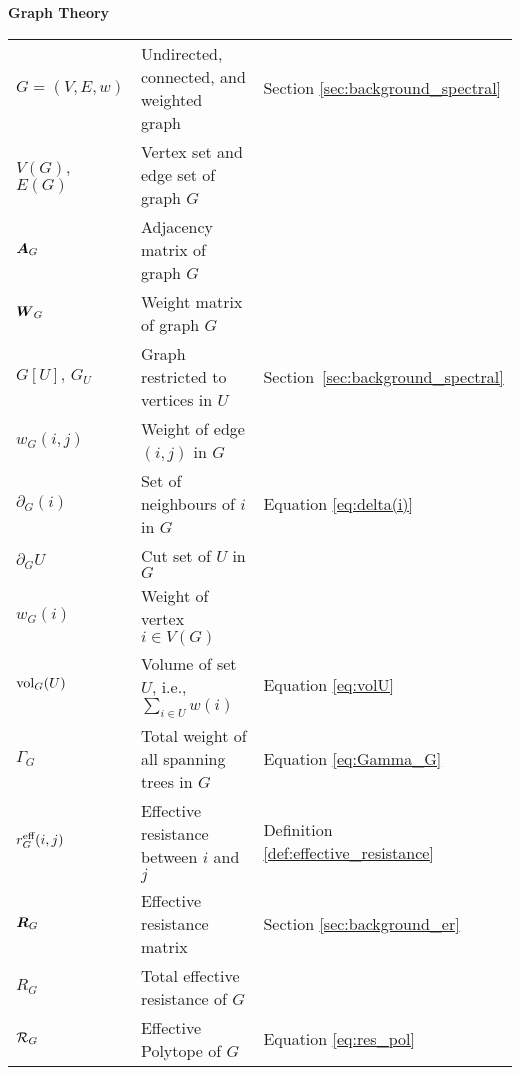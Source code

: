 \noindent \textbf{Graph Theory}\\
\vspace{\headingsep}
\begin{longtable}{p{\colwidth}p{\descsep}l}
	$G=(V,E,w)$ & Undirected, connected, and weighted graph & Section \ref{sec:background_spectral}\\
	$V(G)$, $E(G)$ & Vertex set and edge set of graph $G$\\
	$\vb*{A}_G$ & {Adjacency matrix of graph $G$}\\
	{$\vb*{W}_G$} & {Weight matrix of graph $G$}\\
	$G[U],\, G_U$ & Graph restricted to vertices in $U$  & Section~\ref{sec:background_spectral}\\
	$w_G(i,j)$ & Weight of edge $(i,j)$ in $G$ \\
	$\partial_G(i)$ & Set of neighbours of $i$ in $G$ & Equation \eqref{eq:delta(i)}\\
	$\partial_G U$ & Cut set of $U$ in $G$ \\
	$w_G(i)$ & Weight of vertex $i\in V(G)$\\
	$\textnormal{vol}_G(U)$ & Volume of set $U$, i.e., $\sum_{i\in U}w(i)$ & Equation \eqref{eq:volU}\\
	$\Gamma_G$ & Total weight of all spanning trees in $G$ & Equation \eqref{eq:Gamma_G} \\
	$r^{\text{eff}}_G(i,j)$  & Effective resistance between $i$ and $j$ & Definition \ref{def:effective_resistance}\\
	$\vb*{R}_G$  & Effective resistance matrix & Section \ref{sec:background_er}\\
	$R_G$ & Total effective resistance of $G$ \\
	$\mathcal{R}_G$ & Effective Polytope of $G$ & Equation \eqref{eq:res_pol}
\end{longtable}
\vspace{\groupsep}



